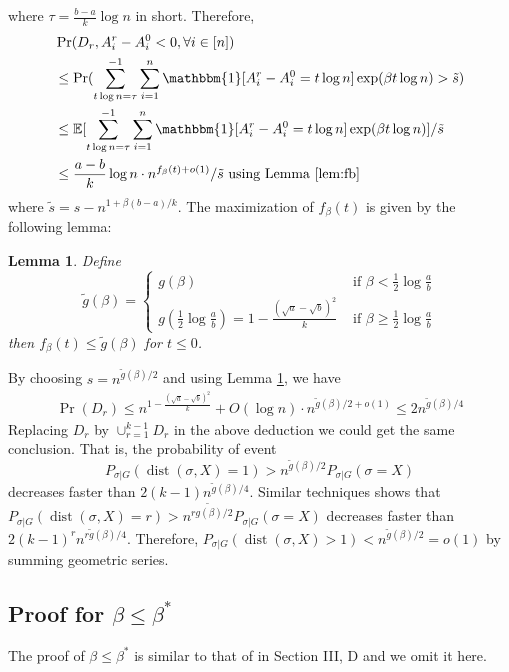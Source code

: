 \documentclass[conference]{IEEEtran}
\newtheorem{lemma}{Lemma}
\DeclareMathOperator{\dist}{dist}
\begin{document}
	where $\tau =\frac{b-a}{k}\log n$ in short. Therefore,
	\begin{align*}
	&\Pr(D_r, A_i^r - A_i^0  < 0, \forall i\in [n])  \\
	&\leq\Pr(\sum_{t\log n =\tau}^{-1}\sum_{i=1}^n \mathbbm{1}[A^r_i - A^0_i = t\log n]\exp ( \beta  t\log n)  > \tilde{s} ) \\
	& \leq \mathbb{E}[\sum_{t\log n =\tau}^{-1}\sum_{i=1}^n \mathbbm{1}[A^r_i - A^0_i= t\log n]\exp ( \beta  t\log n)] /  \tilde{s} \\
	& \leq \frac{a-b}{k}\log n \cdot n^{f_{\beta}(t) + o(1)} / \tilde{s} \textrm{ using Lemma \ref{lem:fb} }
	\end{align*}
	where $\tilde{s} = s - n^{1+\beta(b-a)/k}$. 
	The maximization of $f_{\beta}(t)$ is given by the following lemma:
	\begin{lemma}\label{lem:tilde_g}
		Define
		$$
		\tilde{g}(\beta) = \begin{cases}
		g(\beta)   & \text{~if~} \beta< \frac{1}{2}\log\frac{a}{b} \\
		g(\frac{1}{2} \log\frac{a}{b}) = 1 - \frac{(\sqrt{a}-\sqrt{b})^2}{k} & \text{~if~} \beta\ge \frac{1}{2}\log\frac{a}{b}
		\end{cases}
		$$
		then $f_{\beta}(t) \leq \tilde{g}(\beta)$ for $t\leq 0$.
	\end{lemma}
	By choosing $s = n^{\tilde{g}(\beta)/2}$ and using Lemma \ref{lem:tilde_g}, we have
	\begin{align*}
	\Pr( D_r) \leq  n^{1-\frac{(\sqrt{a}-\sqrt{b})^2}{k}} + O(\log n)  \cdot n^{\tilde{g}(\beta)/2 + o(1)} \leq 2n^{\tilde{g}(\beta)/4}
	\end{align*}
	Replacing $D_r$ by $\cup_{r=1}^{k-1} D_r$ in the above deduction we could get the same conclusion.
	That is, the probability of event
	$$
	P_{\sigma | G}(\dist(\sigma, X) = 1) > n^{\tilde{g}(\beta)/2}P_{\sigma | G}(\sigma = X)\label{eq:betastar_xx}
	$$
	decreases faster than $2(k-1)n^{\tilde{g}(\beta)/4}$.
	Similar techniques shows that $P_{\sigma | G}(\dist(\sigma, X) = r)> n^{r\tilde{g(\beta)}/2}P_{\sigma | G}(\sigma = X)$
	decreases faster than $2(k-1)^r n^{r\tilde{g}(\beta)/4}$. Therefore, $P_{\sigma | G}(\dist(\sigma, X) > 1) < n^{\tilde{g}(\beta)/2} = o(1)$ by summing geometric series.
	
	\subsection{Proof for $\beta\le\beta^\ast$}\label{subsect:smaller}
	The proof of $\beta\le\beta^\ast$ is similar to that of \cite{ye2020exact} in Section III, D and we omit it here.
	
\end{document}
